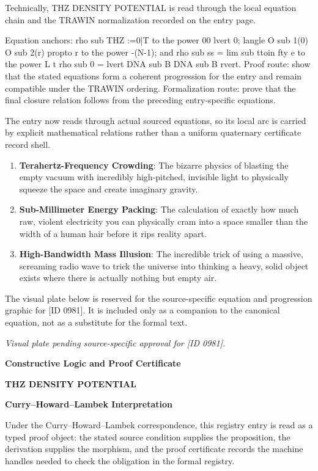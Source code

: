 Technically, THZ DENSITY POTENTIAL is read through the local equation chain and the TRAWIN normalization recorded on the entry page.

Equation anchors: rho sub THZ :=0|T to the power 00 lvert 0; langle O sub 1(0) O sub 2(r) propto r to the power -(N-1); and rho sub ss = lim sub ttoin fty e to the power L t rho sub 0 = lvert DNA sub B DNA sub B rvert. Proof route: show that the stated equations form a coherent progression for the entry and remain compatible under the TRAWIN ordering. Formalization route: prove that the final closure relation follows from the preceding entry-specific equations.

The entry now reads through actual sourced equations, so its local arc is carried by explicit mathematical relations rather than a uniform quaternary certificate record shell.
\endgroup

\begin{enumerate}[leftmargin=1.6em,itemsep=6pt,topsep=4pt]
\item \textbf{Terahertz-Frequency Crowding}: The bizarre physics of blasting the empty vacuum with incredibly high-pitched, invisible light to physically squeeze the space and create imaginary gravity.
\item \textbf{Sub-Millimeter Energy Packing}: The calculation of exactly how much raw, violent electricity you can physically cram into a space smaller than the width of a human hair before it rips reality apart.
\item \textbf{High-Bandwidth Mass Illusion}: The incredible trick of using a massive, screaming radio wave to trick the universe into thinking a heavy, solid object exists where there is actually nothing but empty air.
\end{enumerate}

\begingroup\footnotesize\sloppy
The visual plate below is reserved for the source-specific equation and progression graphic for [ID 0981]. It is included only as a companion to the canonical equation, not as a substitute for the formal text.
\par\endgroup
\begingroup\footnotesize\itshape
Visual plate pending source-specific approval for [ID 0981].
\par\endgroup

\clearpage
\begingroup\tzpsupportsetup
\noindent\textbf{\fontsize{10.8pt}{12.8pt}\selectfont [ID 0981] Constructive Logic and Proof Certificate}\par
\noindent\textbf{\fontsize{10pt}{12pt}\selectfont THZ DENSITY POTENTIAL}\par
\vspace{0.45em}
\begingroup
\footnotesize
\setlength{\parskip}{0.22em}
\setlength{\parindent}{0pt}
\noindent\textbf{Curry--Howard--Lambek Interpretation}\par
Under the Curry--Howard--Lambek correspondence, this registry entry is read as a typed proof
object: the stated source condition supplies the proposition, the derivation supplies the
morphism, and the proof certificate records the machine handles needed to check the obligation
in the formal registry.

